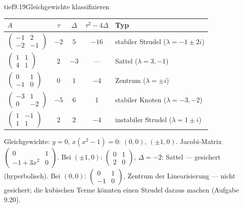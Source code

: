 \begin{loesungkarte}{tief}{9.19}{Gleichgewichte klassifizieren}
\begin{center}\small
\begin{tabular}{l|ccc|l}
$A$ & $\tau$ & $\Delta$ & $\tau^{2} - 4\Delta$ & Typ\\ \hline
$\begin{pmatrix}-1&2\\-2&-1\end{pmatrix}$ & $-2$ & $5$ & $-16$ & stabiler Strudel ($\lambda = -1\pm2i$)\\
$\begin{pmatrix}1&1\\4&1\end{pmatrix}$ & $2$ & $-3$ & --- & Sattel ($\lambda = 3, -1$)\\
$\begin{pmatrix}0&1\\-1&0\end{pmatrix}$ & $0$ & $1$ & $-4$ & Zentrum ($\lambda = \pm i$)\\
$\begin{pmatrix}-3&1\\0&-2\end{pmatrix}$ & $-5$ & $6$ & $1$ & stabiler Knoten ($\lambda = -3, -2$)\\
$\begin{pmatrix}1&-1\\1&1\end{pmatrix}$ & $2$ & $2$ & $-4$ & instabiler Strudel ($\lambda = 1\pm i$)
\end{tabular}
\end{center}
Gleichgewichte: $y = 0$, $x(x^{2} - 1) = 0$: $(0, 0)$, $(\pm1, 0)$. Jacobi-Matrix $\begin{pmatrix}0&1\\-1 + 3x^{2}&0\end{pmatrix}$. Bei $(\pm1, 0)$: $\begin{pmatrix}0&1\\2&0\end{pmatrix}$, $\Delta = -2$: Sattel --- gesichert (hyperbolisch). Bei $(0, 0)$: $\begin{pmatrix}0&1\\-1&0\end{pmatrix}$, Zentrum der Linearisierung --- nicht gesichert; die kubischen Terme könnten einen Strudel daraus machen (Aufgabe 9.20).

\end{loesungkarte}
